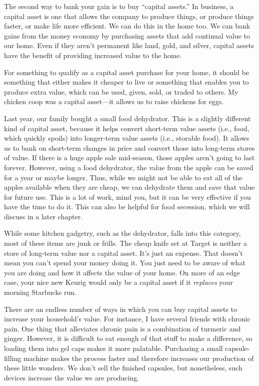 The second way to bank your gain is to buy ``capital assets.''  In
business, a capital asset is one that allows the company to produce
things, or produce things faster, or make life more efficient. We can
do this in the home too. We can bank gains from the money economy by
purchasing assets that add continual value to our home. Even if they
aren’t permanent like land, gold, and silver, capital assets have the
benefit of providing increased value to the home. 

For something to qualify as a capital asset purchase for your home, it
should be something that either makes it cheaper to live or something
that enables you to produce extra value, which can be used, given,
sold, or traded to others. My chicken coop was a capital asset---it
allows us to raise chickens for eggs. 

Last year, our family bought a small food dehydrator. This is a slightly
different kind of capital asset, because it helps convert short-term
value assets (i.e., food, which quickly spoils) into longer-term value assets (i.e., storable
food). It allows us to bank on short-term changes in price and convert
those into long-term stores of value. If there is a huge apple sale
mid-season, those apples aren’t going to last forever. However, using a
food dehydrator, the value from the apple can be saved for a year or
maybe longer. Thus, while we might not be able to eat all of the apples
available when they are cheap, we can dehydrate them and save that
value for future use. This is a lot of work, mind you, but it can be
very effective if you have the time to do it. This can also be helpful
for food secession, which we will discuss in a later chapter.

While some kitchen gadgetry, such as the
dehydrator, falls into this category, most of these items are junk or
frills. The cheap knife set at Target is neither a store of long-term
value nor a capital asset. It’s just an expense. That doesn’t mean you
can’t spend your money doing it. You just need to be aware of what you
are doing and how it affects the value of your home. On more of an edge
case, your nice new Keurig would only be a capital asset if it
\textit{replaces} your morning Starbucks run.

There are an endless
number of ways in which you can buy capital assets to increase your
household’s value. For instance, I have several friends with chronic
pain. One thing that alleviates chronic pain is a combination of
turmeric and ginger. However, it is difficult to eat enough
of that stuff to make a difference, so loading them into gel caps makes
it more palatable. Purchasing a small capsule-filling machine makes
the process faster and therefore increases our production of these
little wonders. We don’t sell the finished capsules, but nonetheless, such devices
increase the value we are producing.

